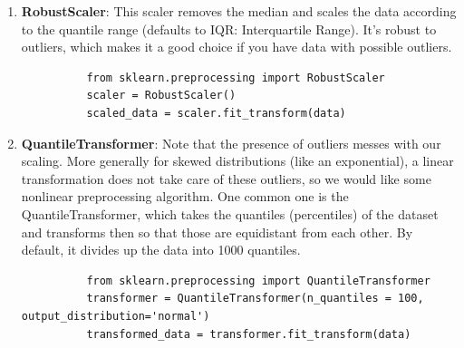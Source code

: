 \documentclass{article}
\begin{document}
\begin{enumerate}
          \item \textbf{RobustScaler}: This scaler removes the median and scales the data according to the quantile range (defaults to IQR: Interquartile Range). It's robust to outliers, which makes it a good choice if you have data with possible outliers. 
          \begin{lstlisting}
          from sklearn.preprocessing import RobustScaler
          scaler = RobustScaler()
          scaled_data = scaler.fit_transform(data)
          \end{lstlisting} 

          \item \textbf{QuantileTransformer}: Note that the presence of outliers messes with our scaling. More generally for skewed distributions (like an exponential), a linear transformation does not take care of these outliers, so we would like some nonlinear preprocessing algorithm. One common one is the QuantileTransformer, which takes the quantiles (percentiles) of the dataset and transforms then so that those are equidistant from each other. By default, it divides up the data into 1000 quantiles. 
          \begin{lstlisting}
          from sklearn.preprocessing import QuantileTransformer
          transformer = QuantileTransformer(n_quantiles = 100, output_distribution='normal')
          transformed_data = transformer.fit_transform(data)
          \end{lstlisting}
      \end{enumerate}
\end{document}
